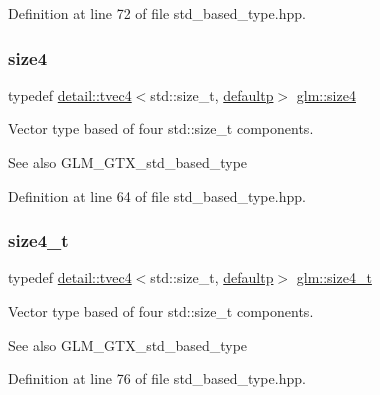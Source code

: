 Definition at line 72 of file std\+\_\+based\+\_\+type.\+hpp.

\mbox{\label{group__gtx__std__based__type_gac04a40cfe44b5035770cf26d98a9349d}} 
\subsubsection{\texorpdfstring{size4}{size4}}
{\footnotesize\ttfamily typedef \hyperlink{structglm_1_1detail_1_1tvec4}{detail\+::tvec4}$<$std\+::size\+\_\+t, \hyperlink{namespaceglm_a0f04f086094c747d227af4425893f545a9d21ccd8b5a009ec7eb7677befc3bf51}{defaultp}$>$ \hyperlink{group__gtx__std__based__type_gac04a40cfe44b5035770cf26d98a9349d}{glm\+::size4}}

Vector type based of four std\+::size\+\_\+t components. \begin{DoxySeeAlso}{See also}
G\+L\+M\+\_\+\+G\+T\+X\+\_\+std\+\_\+based\+\_\+type 
\end{DoxySeeAlso}


Definition at line 64 of file std\+\_\+based\+\_\+type.\+hpp.

\mbox{\label{group__gtx__std__based__type_gaaaf9b6a73135945e356601a01beece30}} 
\subsubsection{\texorpdfstring{size4\+\_\+t}{size4\_t}}
{\footnotesize\ttfamily typedef \hyperlink{structglm_1_1detail_1_1tvec4}{detail\+::tvec4}$<$std\+::size\+\_\+t, \hyperlink{namespaceglm_a0f04f086094c747d227af4425893f545a9d21ccd8b5a009ec7eb7677befc3bf51}{defaultp}$>$ \hyperlink{group__gtx__std__based__type_gaaaf9b6a73135945e356601a01beece30}{glm\+::size4\+\_\+t}}

Vector type based of four std\+::size\+\_\+t components. \begin{DoxySeeAlso}{See also}
G\+L\+M\+\_\+\+G\+T\+X\+\_\+std\+\_\+based\+\_\+type 
\end{DoxySeeAlso}


Definition at line 76 of file std\+\_\+based\+\_\+type.\+hpp.

